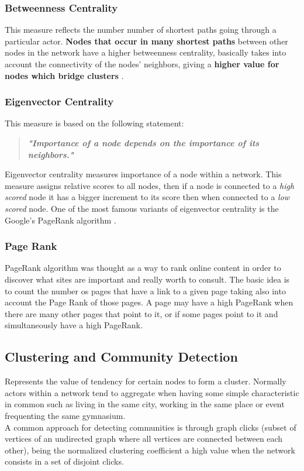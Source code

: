 \subsubsection*{Betweenness Centrality}
This measure reflects the number number of shortest paths going through a particular actor. \textbf{Nodes that
occur in many shortest paths} between other nodes in the network have a higher betweenness centrality, basically
takes into account the connectivity of the nodes' neighbors, giving a \textbf{higher value for nodes which bridge clusters} \footnotemark[2].

\subsubsection*{Eigenvector Centrality}
This measure is based on the following statement:

\begin{quote}
\textbf{\textit{"Importance of a node depends on the importance of its neighbors."}}
\end{quote}

Eigenvector centrality \footnotemark[2] measures importance of a node within a network. This measure assigns relative scores to all nodes, then if a node is connected to a \textit{high scored} node it has a bigger increment to its score then when connected to a \textit{low scored} node. One of the most famous variants of eigenvector centrality is the Google's PageRank algorithm \citep{brin1998anatomy}.

\subsubsection*{Page Rank}
PageRank algorithm \citep{brin1998anatomy} was thought as a way to rank online content in order to discover
what sites are important and really worth to consult. The basic idea is to count the number os pages that have a link to a given page taking also into account the Page Rank of those pages. A page may have a high PageRank when there are many other pages that point to it, or if some pages point to it and simultaneously have a high PageRank.

\subsection{Clustering and Community Detection}
Represents the value of tendency for certain nodes to form a cluster. Normally actors within a network tend to aggregate when having some simple characteristic in common such as living in the same city, working in the same place or event frequenting the same gymnasium.\\
\indent A common approach for detecting communities is through graph clicks (subset of vertices of an
undirected graph where all vertices are connected between each other), being the normalized clustering coefficient a high value
when the network consists in a set of disjoint clicks.

